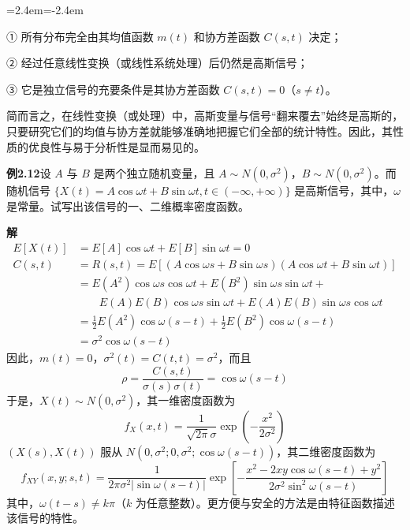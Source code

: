 \documentclass[11pt,openany,UTF8]{ctexbook}
\newenvironment{citemize}
  {\begin{list}{}{\leftmargin=2.4em\itemindent=-2.4em\itemsep=1pt\topsep=3pt\parsep=0pt}}
  {\end{list}}
\begin{document}
\begin{citemize}
\item ① 所有分布完全由其均值函数 $m(t)$ 和协方差函数 $C(s,t)$ 决定\nobreak；
\item ② 经过任意线性变换（或线性系统处理\nobreak）后仍然是高斯信号\nobreak；
\item ③ 它是独立信号的充要条件是其协方差函数 $C(s,t)=0$（$s\neq t$\nobreak）\nobreak。
\end{citemize}

简而言之\nobreak，在线性变换（或处理\nobreak）中\nobreak，高斯变量与信号“翻来覆去”始终是高斯的\nobreak，只要研究它们的均值与协方差就能够准确地把握它们全部的统计特性\nobreak。因此\nobreak，其性质的优良性与易于分析性是显而易见的\nobreak。

\begin{examplebox}
\textbf{例2.12}\quad 设 $A$ 与 $B$ 是两个独立随机变量\nobreak，且 $A\sim N(0,\sigma^2)$\nobreak，$B\sim N(0,\sigma^2)$\nobreak。而随机信号 $\{X(t)=A\cos\omega t+B\sin\omega t,t\in(-\infty,+\infty)\}$ 是高斯信号\nobreak，其中\nobreak，$\omega$ 是常量\nobreak。试写出该信号的一\nobreak、二维概率密度函数\nobreak。

\textbf{解}\quad
\[
\begin{aligned}
E[X(t)]&=E[A]\cos\omega t+E[B]\sin\omega t=0\\
C(s,t)&=R(s,t)=E[(A\cos\omega s+B\sin\omega s)(A\cos\omega t+B\sin\omega t)]\\
&=E(A^2)\cos\omega s\cos\omega t+E(B^2)\sin\omega s\sin\omega t+{}\\
&\qquad E(A)E(B)\cos\omega s\sin\omega t+E(A)E(B)\sin\omega s\cos\omega t\\
&=\frac{1}{2}E(A^2)\cos\omega(s-t)+\frac{1}{2}E(B^2)\cos\omega(s-t)\\
&=\sigma^2\cos\omega(s-t)
\end{aligned}
\]
因此\nobreak，$m(t)=0$\nobreak，$\sigma^2(t)=C(t,t)=\sigma^2$\nobreak，而且
\[
\rho=\frac{C(s,t)}{\sigma(s)\sigma(t)}=\cos\omega(s-t)
\]
于是\nobreak，$X(t)\sim N(0,\sigma^2)$\nobreak，其一维密度函数为
\[
f_X(x,t)=\frac{1}{\sqrt{2\pi}\sigma}\exp\left(-\frac{x^2}{2\sigma^2}\right)
\]
$(X(s),X(t))$ 服从 $N(0,\sigma^2;0,\sigma^2;\cos\omega(s-t))$\nobreak，其二维密度函数为
\[
f_{XY}(x,y;s,t)=\frac{1}{2\pi\sigma^2\lvert\sin\omega(s-t)\rvert}\exp\left[-\frac{x^2-2xy\cos\omega(s-t)+y^2}{2\sigma^2\sin^2\omega(s-t)}\right]
\]
其中\nobreak，$\omega(t-s)\neq k\pi$（$k$ 为任意整数\nobreak）\nobreak。更方便与安全的方法是由特征函数描述该信号的特性\nobreak。


\end{examplebox}
\end{document}
